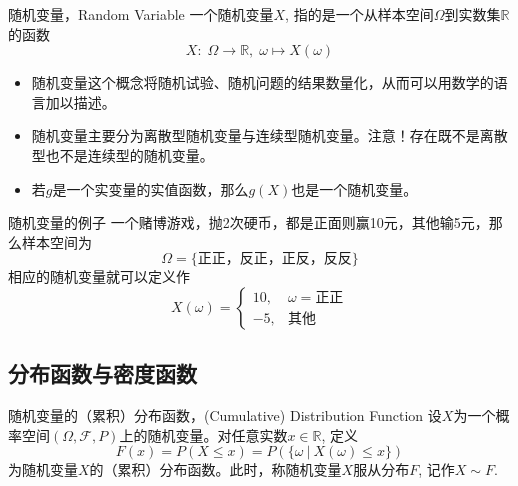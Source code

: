 \begin{frame}

\begin{block}{随机变量，Random Variable}
一个随机变量$X$, 指的是一个从{\color{red}样本空间}$\Omega$到实数集$\mathbb{R}$的函数
$$X: \; \Omega \rightarrow \mathbb{R}, \; \omega \mapsto X(\omega)$$
\end{block}

\vspace{1em}
\pause

\begin{remark}
\begin{itemize}
\item 随机变量这个概念将随机试验、随机问题的结果数量化，从而可以用数学的语言加以描述。
\item 随机变量主要分为离散型随机变量与连续型随机变量。{\color{red}注意}！存在既不是离散型也不是连续型的随机变量。
\item 若$g$是一个实变量的实值函数，那么$g(X)$也是一个随机变量。
\end{itemize}
\end{remark}

\end{frame}


\begin{frame}

\begin{block}{随机变量的例子}
一个赌博游戏，抛2次硬币，都是正面则赢10元，其他输5元，那么样本空间为
$$\Omega = \{\text{正正，反正，正反，反反}\}$$
相应的随机变量就可以定义作
$$X(\omega) = \begin{cases}
10, & \omega = \text{正正} \\
-5, & \text{其他}
\end{cases}$$
\end{block}

\end{frame}


\subsection{分布函数与密度函数}


\begin{frame}

\begin{block}{随机变量的（累积）分布函数，(Cumulative) Distribution Function}
设$X$为一个{\color{red}概率空间}$(\Omega, \mathcal{F}, P)$上的随机变量。对任意实数$x\in\mathbb{R}$, 定义
$$F(x) = P(X \le x) = P(\{\omega \ |\ X(\omega) \le x\})$$
为随机变量$X$的（累积）分布函数。此时，称随机变量$X$服从分布$F$, 记作$X \sim F$.
\end{block}

\end{frame}

